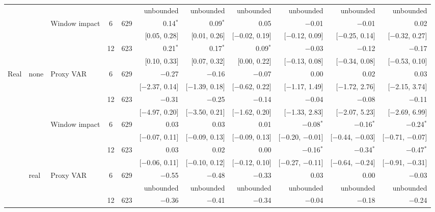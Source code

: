 \begin{longtable}{lllcrrrrrrr}
 & & & & & {\tiny unbounded} & {\tiny unbounded} & {\tiny unbounded} & {\tiny unbounded} & {\tiny unbounded} & {\tiny unbounded}\\
 &  & Window impact & 6 & 629 & 0.14$^{*}$ & 0.09$^{*}$ & 0.05 & $-$0.01 & $-$0.01 & 0.02\\
 & & & & & {\tiny [0.05, 0.28]} & {\tiny [0.01, 0.26]} & {\tiny [$-$0.02, 0.19]} & {\tiny [$-$0.12, 0.09]} & {\tiny [$-$0.25, 0.14]} & {\tiny [$-$0.32, 0.27]}\\
 &  &  & 12 & 623 & 0.21$^{*}$ & 0.17$^{*}$ & 0.09$^{*}$ & $-$0.03 & $-$0.12 & $-$0.17\\
 & & & & & {\tiny [0.10, 0.33]} & {\tiny [0.07, 0.32]} & {\tiny [0.00, 0.22]} & {\tiny [$-$0.13, 0.08]} & {\tiny [$-$0.34, 0.08]} & {\tiny [$-$0.53, 0.10]}\\
\addlinespace
Real & none & Proxy VAR & 6 & 629 & $-$0.27 & $-$0.16 & $-$0.07 & 0.00 & 0.02 & 0.03\\
 & & & & & {\tiny [$-$2.37, 0.14]} & {\tiny [$-$1.39, 0.18]} & {\tiny [$-$0.62, 0.22]} & {\tiny [$-$1.17, 1.49]} & {\tiny [$-$1.72, 2.76]} & {\tiny [$-$2.15, 3.74]}\\
 &  &  & 12 & 623 & $-$0.31 & $-$0.25 & $-$0.14 & $-$0.04 & $-$0.08 & $-$0.11\\
 & & & & & {\tiny [$-$4.97, 0.20]} & {\tiny [$-$3.50, 0.21]} & {\tiny [$-$1.62, 0.20]} & {\tiny [$-$1.33, 2.83]} & {\tiny [$-$2.07, 5.23]} & {\tiny [$-$2.69, 6.99]}\\
 &  & Window impact & 6 & 629 & 0.03 & 0.03 & 0.01 & $-$0.08$^{*}$ & $-$0.16$^{*}$ & $-$0.24$^{*}$\\
 & & & & & {\tiny [$-$0.07, 0.11]} & {\tiny [$-$0.09, 0.13]} & {\tiny [$-$0.09, 0.13]} & {\tiny [$-$0.20, $-$0.01]} & {\tiny [$-$0.44, $-$0.03]} & {\tiny [$-$0.71, $-$0.07]}\\
 &  &  & 12 & 623 & 0.03 & 0.02 & 0.00 & $-$0.16$^{*}$ & $-$0.34$^{*}$ & $-$0.47$^{*}$\\
 & & & & & {\tiny [$-$0.06, 0.11]} & {\tiny [$-$0.10, 0.12]} & {\tiny [$-$0.12, 0.10]} & {\tiny [$-$0.27, $-$0.11]} & {\tiny [$-$0.64, $-$0.24]} & {\tiny [$-$0.91, $-$0.31]}\\
 & real & Proxy VAR & 6 & 629 & $-$0.55 & $-$0.48 & $-$0.33 & 0.03 & 0.00 & $-$0.03\\
 & & & & & {\tiny unbounded} & {\tiny unbounded} & {\tiny unbounded} & {\tiny unbounded} & {\tiny unbounded} & {\tiny unbounded}\\
 &  &  & 12 & 623 & $-$0.36 & $-$0.41 & $-$0.34 & $-$0.04 & $-$0.18 & $-$0.24\\

\end{longtable}

